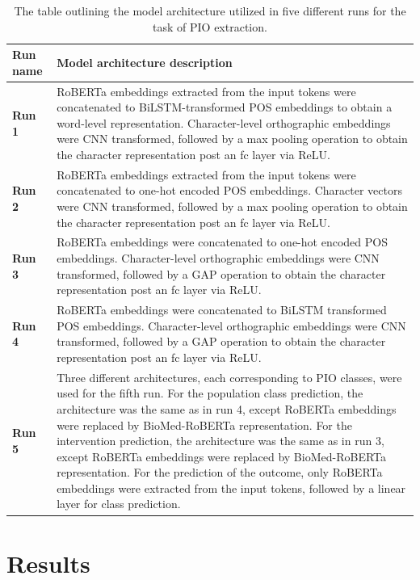 \documentclass[11pt]{article}
\begin{document}
\begin{table}[]
    \centering
    \begin{tabular}{lp{13cm}}
    \toprule
   Run name & Model architecture description \\ \midrule
       \textbf{Run 1} & RoBERTa embeddings extracted from the input tokens were concatenated to BiLSTM-transformed POS embeddings to obtain a word-level representation. Character-level orthographic embeddings were CNN transformed, followed by a max pooling operation to obtain the character representation post an fc layer via ReLU. \\
       \textbf{Run 2} & RoBERTa embeddings extracted from the input tokens were concatenated to one-hot encoded POS embeddings. Character vectors were CNN transformed, followed by a max pooling operation to obtain the character representation post an fc layer via ReLU. \\
        \textbf{Run 3} & RoBERTa embeddings were concatenated to one-hot encoded POS embeddings. Character-level orthographic embeddings were CNN transformed, followed by a GAP operation to obtain the character representation post an fc layer via ReLU. \\
        \textbf{Run 4} & RoBERTa embeddings were concatenated to BiLSTM transformed POS embeddings. Character-level orthographic embeddings were CNN transformed, followed by a GAP operation to obtain the character representation post an fc layer via ReLU. \\
        \textbf{Run 5}  & Three different architectures, each corresponding to PIO classes, were used for the fifth run. For the population class prediction, the architecture was the same as in run 4, except RoBERTa embeddings were replaced by BioMed-RoBERTa representation. For the intervention prediction, the architecture was the same as in run 3, except RoBERTa embeddings were replaced by BioMed-RoBERTa representation. For the prediction of the outcome, only RoBERTa embeddings were extracted from the input tokens, followed by a linear layer for class prediction. \\
         \bottomrule
    \end{tabular}
    \caption{The table outlining the model architecture utilized in five different runs for the task of PIO extraction.}
    \label{tab:runs_task2}
\end{table}

%

%
%
%
\section{Results}
\label{results}
%
%
%
\end{document}
